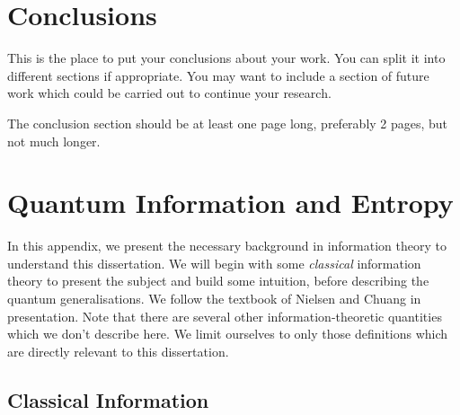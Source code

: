 \documentclass[12pt,a4paper]{report}
\numberwithin{equation}{section}
\theoremstyle{definition}
\theoremstyle{theorem}
\theoremstyle{theorem}
\theoremstyle{example}
\theoremstyle{definition}
\begin{document}
\chapter{Conclusions}

This is the place to put your conclusions about your work. You can
split it into different sections if appropriate. You may want to include
a section of future work which could be carried out to continue your
research.

The conclusion section should be at least one page long, preferably 2
pages, but not much longer.

\appendix

\chapter{Quantum Information and Entropy}
In this appendix, we present the necessary background in information theory to understand this dissertation. We will begin with some \textit{classical} information theory to present the subject and build some intuition, before describing the quantum generalisations. We follow the textbook of Nielsen and Chuang\cite{NielsenChuang} in presentation. Note that there are several other information-theoretic quantities which we don't describe here. We limit ourselves to only those definitions which are directly relevant to this dissertation.
\section{Classical Information}
\end{document}

